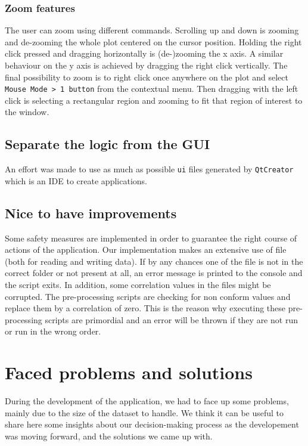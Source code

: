 \documentclass[11pt,a4paper]{article}
\begin{document}
\subsubsection{Zoom features}
The user can zoom using different commands. Scrolling up and down is zooming and de-zooming the whole plot centered on the cursor position. Holding the right click pressed and dragging horizontally is (de-)zooming the x axis. A similar behaviour on the y axis is achieved by dragging the right click vertically. The final possibility to zoom is to right click once anywhere on the plot and select \texttt{Mouse Mode > 1 button} from the contextual menu. Then dragging with the left click is selecting a rectangular region and zooming to fit that region of interest to the window.

\subsection{Separate the logic from the GUI}
An effort was made to use as much as possible \texttt{ui} files generated by \texttt{QtCreator} which is an IDE to create applications. 

\subsection{Nice to have improvements}
Some safety measures are implemented in order to guarantee the right course of actions of the application. Our implementation makes an extensive use of file (both for reading and writing data). If by any chances one of the file is not in the correct folder or not present at all, an error message is printed to the console and the script exits. In addition, some correlation values in the files might be corrupted. The pre-processing scripts are checking for non conform values and replace them by a correlation of zero. This is the reason why executing these pre-processing scripts are primordial and an error will be thrown if they are not run or run in the wrong order. 

\section{Faced problems and solutions}
\label{sec:faced-problems-and-solutions}

During the development of the application, we had to face up some problems, mainly due to the size of the dataset to handle.
We think it can be useful to share here some insights about our decision-making process as the developement was moving forward, and the solutions we came up with.\\
\end{document}
